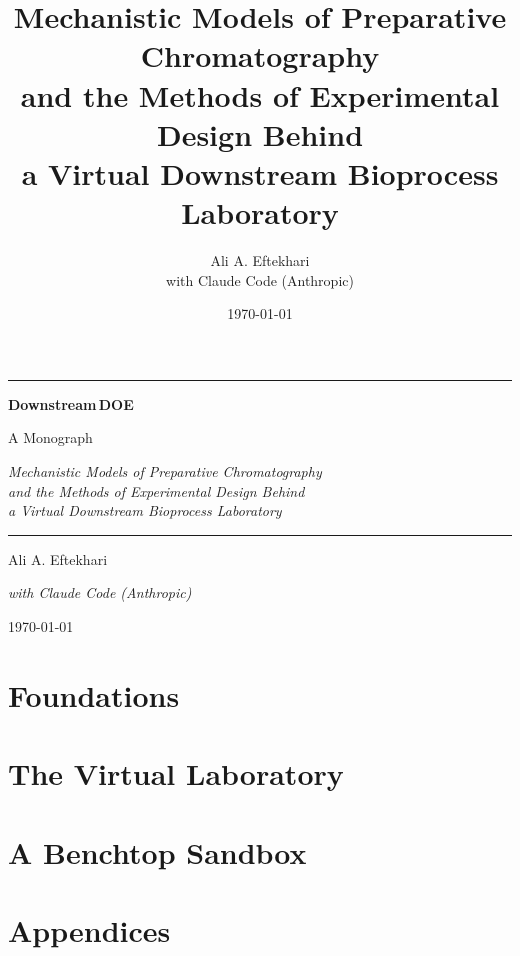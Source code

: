 \documentclass[11pt,openright]{book}
\title{\bfseries Mechanistic Models of Preparative Chromatography\\[0.4em]
       \large and the Methods of Experimental Design Behind\\
       a Virtual Downstream Bioprocess Laboratory}
\author{Ali A. Eftekhari \\ with Claude Code (Anthropic)}
\date{\today}
\theoremstyle{definition}
\begin{document}
\begin{titlepage}
\centering
\vspace*{2cm}
{\color{accent}\rule{\linewidth}{1.2pt}}\par\vspace{1.2em}
{\Huge\bfseries Downstream\,DOE}\par\vspace{0.6em}
{\Large A Monograph}\par\vspace{1.2em}
{\large\itshape Mechanistic Models of Preparative Chromatography\\[0.3em]
and the Methods of Experimental Design Behind\\[0.3em]
a Virtual Downstream Bioprocess Laboratory}\par\vspace{1em}
{\color{accent}\rule{\linewidth}{1.2pt}}\par
\vfill
{\large Ali A. Eftekhari}\par\vspace{0.2em}
{\normalsize\itshape with Claude Code (Anthropic)}\par\vspace{0.4em}
{\normalsize \today}\par
\vspace{2cm}
\end{titlepage}

\frontmatter
{}

\cleardoublepage

\cleardoublepage

\cleardoublepage
\tableofcontents
\listoffigures

\mainmatter
{}

\part{Foundations}



\part{The Virtual Laboratory}




\part{A Benchtop Sandbox}


\appendix
\part{Appendices}


\backmatter

\end{document}
